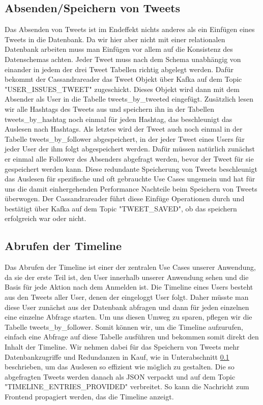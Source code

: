 \subsection{Absenden/Speichern von Tweets}
\label{subsec:Tweetabfrage}
Das Absenden von Tweets ist im Endeffekt nichts anderes als ein Einfügen eines Tweets in die Datenbank. Da wir hier aber nicht mit einer relationalen Datenbank arbeiten muss man Einfügen vor allem auf die Konsistenz des Datenschemas achten. Jeder Tweet muss nach dem Schema unabhängig von einander in jedem der drei Tweet Tabellen richtig abgelegt werden. Dafür bekommt der Cassandrareader das Tweet Objekt über Kafka auf dem Topic "USER\_ISSUES\_TWEET"  zugeschickt. Dieses Objekt wird dann mit dem Absender als User in die Tabelle tweets\_by\_tweeted eingefügt. Zusätzlich lesen wir alle Hashtags des Tweets aus und speichern ihn in der Tabellen tweets\_by\_hashtag noch einmal für jeden Hashtag, das beschleunigt das Auslesen nach Hashtags. Als letztes wird der Tweet auch noch einmal in der Tabelle tweets\_by\_follower abgespeichert, in der jeder Tweet eines Users für jeder User der ihm folgt abgespeichert werden. Dafür müssen natürlich zunächst er einmal alle Follower des Absenders abgefragt werden, bevor der Tweet für sie gespeichert werden kann. Diese redundante Speicherung von Tweets beschleunigt das Auslesen für spezifische und oft gebrauchte Use Cases ungemein und hat für uns die damit einhergehenden Performance Nachteile beim Speichern von Tweets überwogen. Der Cassandrareader führt diese Einfüge Operationen durch und bestätigt über Kafka auf dem Topic "TWEET\_SAVED", ob das speichern erfolgreich war oder nicht.


\subsection{Abrufen der Timeline}
\label{subsec:Timeline}
Das Abrufen der Timeline ist einer der zentralen Use Cases unserer Anwendung, da sie der erste Teil ist, den User innerhalb unserer Anwendung sehen und die Basis für jede Aktion nach dem Anmelden ist. Die Timeline eines Users besteht aus den Tweets aller User, denen der eingeloggt User folgt. Daher müsste man diese User zunächst aus der Datenbank abfragen und dann für jeden einzelnen eine einzelne Abfrage starten. Um uns diesen Umweg zu sparen, pflegen wir die Tabelle tweets\_by\_follower. Somit können wir, um die Timeline aufzurufen, einfach eine Abfrage auf diese Tabelle ausführen und bekommen somit direkt den Inhalt der Timeline. Wir nehmen dabei für das Speichern von Tweets mehr Datenbankzugriffe und Redundanzen in Kauf, wie in Unterabschnitt \ref{subsec:Tweetabfrage} beschrieben, um das Auslesen so effizient wie möglich zu gestalten. Die so abgefragten Tweets werden danach als JSON verpackt und auf dem Topic "TIMELINE\_ENTRIES\_PROVIDED" verbreitet. So kann die Nachricht zum Frontend propagiert werden, das die Timeline anzeigt.


